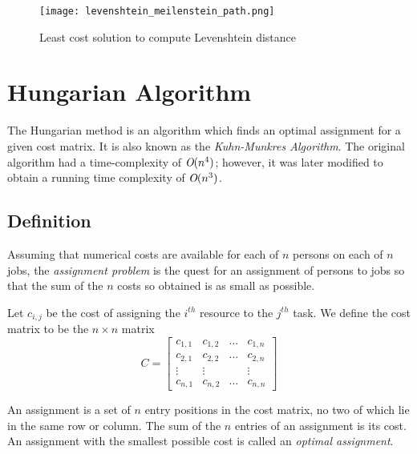 			\begin{figure}[h!]
				\centering
				\texttt{[image: levenshtein\_meilenstein\_path.png]}
				\caption{Least cost solution to compute Levenshtein distance  \label{levenshtein_path}}
			\end{figure}

	\section{Hungarian Algorithm}
	\label{sec:hungarian}
		The Hungarian method is an algorithm which finds an optimal assignment for a given cost matrix. It is also known as the \emph{Kuhn-Munkres Algorithm}. The original algorithm \cite{kuhn1955hungarian} had a time-complexity of \(\emph{O}(n^4)\); however, it was later modified to obtain a running time complexity of \(\emph{O}(n^3)\).
		
		\subsection{Definition}
			Assuming that numerical costs are available for each of \(n\) persons on each of \(n\) jobs, the \emph{assignment problem} is the quest for an assignment of persons to jobs so that the sum of the \(n\) costs so obtained is as small as possible.
			
			Let \(c_{i,j}\) be the cost of assigning the \(i^{th}\) resource to the \(j^{th}\) task. We define the cost matrix to be the \(n \times n\) matrix
		\[ C =
			 \begin{bmatrix}
			 	c_{1,1} &	c_{1,2} &	\dots &	c_{1,n} \\
			 	c_{2,1} &	c_{2,2} &	\dots &	c_{2,n} \\
			 	\vdots &	\vdots &	&	\vdots \\
			 	c_{n,1} &	c_{n,2} &	\dots &	c_{n,n}
			\end{bmatrix}
		\]
		
		An assignment is a set of \(n\) entry positions in the cost matrix, no two of which lie in the same row or column. The sum of the \(n\) entries of an assignment is its cost. An assignment with the smallest possible cost is called an \emph{optimal assignment}.
	
